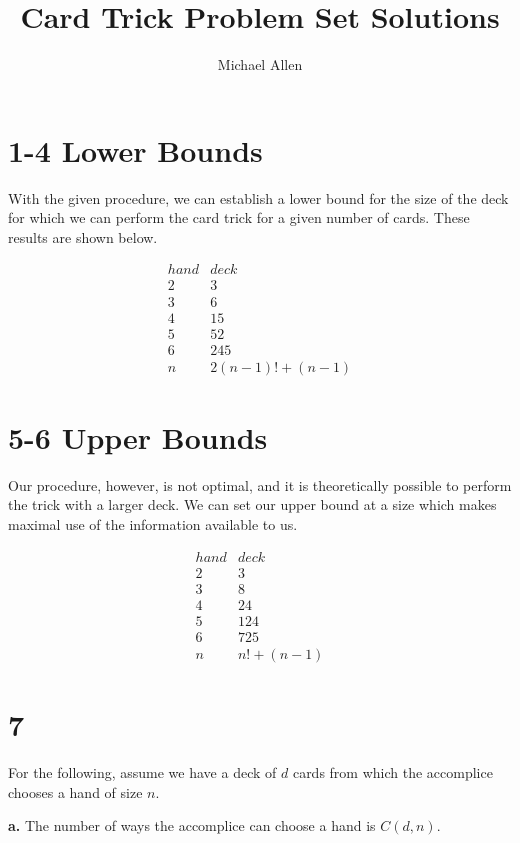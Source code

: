 \documentclass[12pt]{article}
\title{Card Trick Problem Set Solutions}
\author{Michael Allen}
\begin{document}
\maketitle

\section*{1-4 Lower Bounds}

With the given procedure, we can establish a lower bound for the
size of the deck for which we can perform the card trick for a
given number of cards. These results are shown below.

$$\begin{array}{c|c}
    hand&   deck \\\hline
    2   &   3 \\
    3   &   6 \\
    4   &   15 \\
    5   &   52 \\
    6   &   245 \\
    n   &   2(n-1)! + (n-1)
  \end{array}$$

\section*{5-6 Upper Bounds}

Our procedure, however, is not optimal, and it is theoretically
possible to perform the trick with a larger deck. We can set our
upper bound at a size which makes maximal use of the information
available to us.

$$\begin{array}{c|c}
    hand&   deck \\\hline
    2   &   3 \\
    3   &   8 \\
    4   &   24 \\
    5   &   124 \\
    6   &   725 \\
    n   &   n! + (n-1)
  \end{array}$$

\newpage
\section*{7}

For the following, assume we have a deck of $d$ cards from which
the accomplice chooses a hand of size $n$.

{\bf a.} The number of ways the accomplice can choose a hand is
$C(d,n)$.
\end{document}
